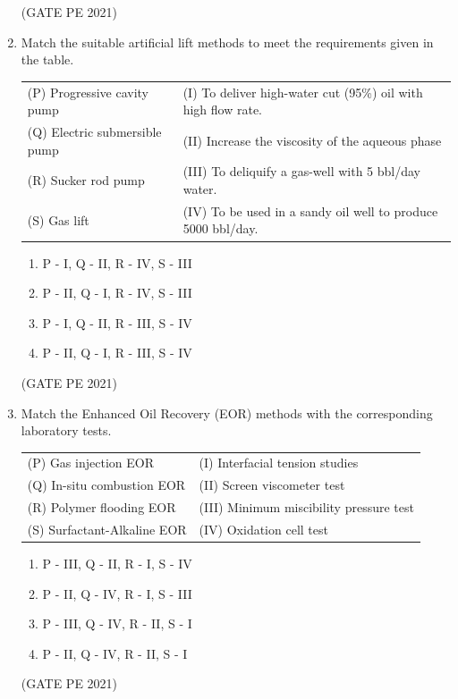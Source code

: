 \documentclass[journal,12pt,onecolumn]{IEEEtran}
\theoremstyle{remark}
\begin{document}
\begin{enumerate}
\hfill{(GATE PE 2021)}

\item Match the suitable artificial lift methods to meet the requirements given in the table.\\
\begin{tabular}{ll}
(P) Progressive cavity pump & (I) To deliver high-water cut (95\%) oil with high flow rate. \\
(Q) Electric submersible pump & (II) Increase the viscosity of the aqueous phase \\
(R) Sucker rod pump & (III) To deliquify a gas-well with 5 bbl/day water. \\
(S) Gas lift & (IV) To be used in a sandy oil well to produce 5000 bbl/day. \\
\end{tabular}
\begin{enumerate}
    \item P - I, Q - II, R - IV, S - III \\
    \item P - II, Q - I, R - IV, S - III \\
    \item P - I, Q - II, R - III, S - IV \\
    \item P - II, Q - I, R - III, S - IV
\end{enumerate}
\hfill{(GATE PE 2021)}

\item Match the Enhanced Oil Recovery (EOR) methods with the corresponding laboratory tests.\\
\begin{tabular}{ll}
(P) Gas injection EOR & (I) Interfacial tension studies \\
(Q)  In-situ combustion EOR & (II) Screen viscometer test \\
(R) Polymer flooding EOR & (III) Minimum miscibility pressure test \\
(S) Surfactant-Alkaline EOR & (IV) Oxidation cell test \\
\end{tabular}
\begin{enumerate}
    \item P - III, Q - II, R - I, S - IV \\
    \item P - II, Q - IV, R - I, S - III \\
    \item P - III, Q - IV, R - II, S - I \\
    \item P - II, Q - IV, R - II, S - I
\end{enumerate}
\hfill{(GATE PE 2021)}


\end{enumerate}
\end{document}

